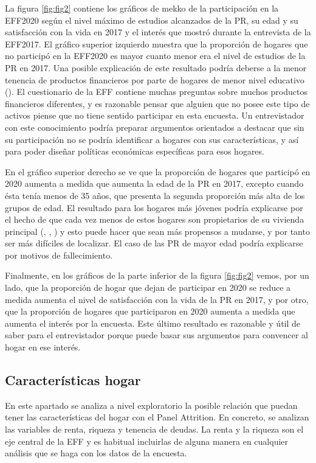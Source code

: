 La figura \ref{fig:fig2} contiene los gráficos de mekko de la participación en la EFF2020 según el nivel máximo de estudios alcanzados de la PR, su edad y su satisfacción con la vida en 2017 y el interés que mostró durante la entrevista de la EFF2017. El gráfico superior izquierdo muestra que la proporción de hogares que no participó en la EFF2020 es mayor cuanto menor era el nivel de estudios de la PR en 2017. Una posible explicación de este resultado podría deberse a la menor tenencia de productos financieros por parte de hogares de menor nivel educativo (\cite{hospido2023encuesta}). El cuestionario de la EFF contiene muchas preguntas sobre muchos productos financieros diferentes, y es razonable pensar que alguien que no posee este tipo de activos piense que no tiene sentido participar en esta encuesta. Un entrevistador con este conocimiento podría preparar argumentos orientados a destacar que sin su participación no se podría identificar a hogares con sus características, y así para poder diseñar políticas económicas específicas para esos hogares.

En el gráfico superior derecho se ve que la proporción de hogares que participó en 2020 aumenta a medida que aumenta la edad de la PR en 2017, excepto cuando ésta tenía menos de 35 años, que presenta la segunda proporción más alta de los grupos de edad. El resultado para los hogares más jóvenes podría explicarse por el hecho de que cada vez menos de estos hogares son propietarios de su vivienda principal (\cite{eff2014results}, \cite{eff2017results}, \cite{eff2020results}) y esto puede hacer que sean más propensos a mudarse, y por tanto ser más difíciles de localizar. El caso de las PR de mayor edad podría explicarse por motivos de fallecimiento.

Finalmente, en los gráficos de la parte inferior de la figura \ref{fig:fig2} vemos, por un lado, que la proporción de hogar que dejan de participar en 2020 se reduce a medida aumenta el nivel de satisfacción con la vida de la PR en 2017, y por otro, que la proporción de hogares que participaron en 2020 aumenta a medida que aumenta el interés por la encuesta. Este último resultado es razonable y útil de saber para el entrevistador porque puede basar sus argumentos para convencer al hogar en ese interés.

\subsection*{Características hogar}

En este apartado se analiza a nivel exploratorio la posible relación que puedan tener las características del hogar con el Panel Attrition. En concreto, se analizan las variables de renta, riqueza y tenencia de deudas. La renta y la riqueza son el eje central de la EFF y es habitual incluirlas de alguna manera en cualquier análisis que se haga con los datos de la encuesta.

